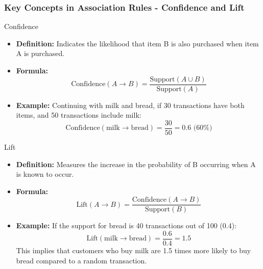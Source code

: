 \documentclass[aspectratio=169]{beamer}
\begin{document}
\begin{frame}[fragile]
    \frametitle{Key Concepts in Association Rules - Confidence and Lift}
    \begin{block}{Confidence}
        \begin{itemize}
            \item \textbf{Definition:} Indicates the likelihood that item B is also purchased when item A is purchased.
            \item \textbf{Formula:}  
            \begin{equation}
                \text{Confidence}(A \rightarrow B) = \frac{\text{Support}(A \cup B)}{\text{Support}(A)}
            \end{equation}
            \item \textbf{Example:} Continuing with milk and bread, if 30 transactions have both items, and 50 transactions include milk:
            \begin{equation}
                \text{Confidence}(\text{milk} \rightarrow \text{bread}) = \frac{30}{50} = 0.6 \text{ (60\%)}
            \end{equation}
        \end{itemize}
    \end{block}

    \begin{block}{Lift}
        \begin{itemize}
            \item \textbf{Definition:} Measures the increase in the probability of B occurring when A is known to occur.
            \item \textbf{Formula:}  
            \begin{equation}
                \text{Lift}(A \rightarrow B) = \frac{\text{Confidence}(A \rightarrow B)}{\text{Support}(B)}
            \end{equation}
            \item \textbf{Example:} If the support for bread is 40 transactions out of 100 (0.4):
            \begin{equation}
                \text{Lift}(\text{milk} \rightarrow \text{bread}) = \frac{0.6}{0.4} = 1.5
            \end{equation}
            This implies that customers who buy milk are 1.5 times more likely to buy bread compared to a random transaction.
        \end{itemize}
    \end{block}
\end{frame}
\end{document}
